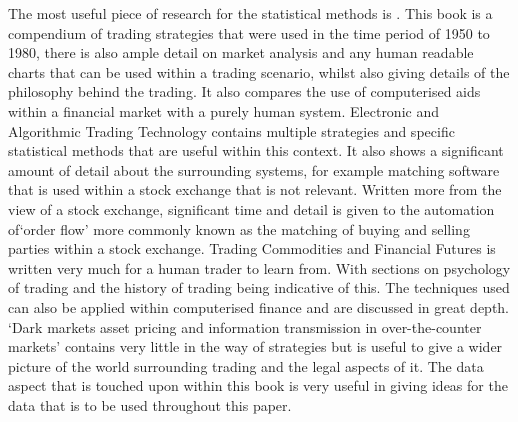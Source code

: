 \documentclass[conference]{IEEEtran}
\begin{document}
The most useful piece of research for the statistical methods is \cite{Murphy1999}. This book is a compendium of trading strategies that were used in the time period of 1950 to 1980, there is also ample detail on market analysis and any human readable charts that can be used within a trading scenario, whilst also giving details of the philosophy behind the trading. It also compares the use of computerised aids within a financial market with a purely human system. Electronic and Algorithmic Trading Technology \cite{Kim2007} contains multiple strategies and specific statistical methods that are useful within this context. It also shows a significant amount of detail about the surrounding systems, for example matching software that is used within a stock exchange that is not relevant. Written more from the view of a stock exchange, significant time and detail is given to the automation of`order flow' more commonly known as the matching of buying and selling parties within a stock exchange. Trading Commodities and Financial Futures \cite{Kleinman2005} is written very much for a human trader to learn from. With sections on psychology of trading and the history of trading being indicative of this. The techniques used can also be applied within computerised finance and are discussed in great depth. `Dark markets asset pricing and information transmission in over-the-counter markets' \cite{Duffie2012} contains very little in the way of strategies but is useful to give a wider picture of the world surrounding trading and the legal aspects of it. The data aspect that is touched upon within this book is very useful in giving ideas for the data that is to be used throughout this paper.
\end{document}
